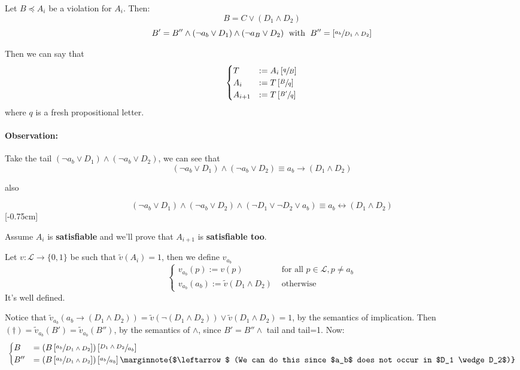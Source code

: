 	\noindent
	Let $B \preceq A_i$ be a violation for $A_i$. Then:
	$$ B = C \vee (D_1 \wedge D_2) $$
	$$ B' = B'' \wedge (\neg a_b \vee D_1) \wedge (\neg a_B \vee D_2) \; \text{ with } \; B'' = \left[\sfrac{a_b}{D_1 \wedge D_2}\right] $$

	\noindent
	Then we can say that
	$$
	\begin{cases}
		T & := A_i \left[\sfrac{q}{B}\right] \\
		A_i & := T \left[\sfrac{B}{q}\right] \\
		A_{i+1} & := T \left[\sfrac{B'}{q}\right]
	\end{cases}
	$$
	where $q$ is a fresh propositional letter.

	\paragraph{Observation:} Take the tail $(\neg a_b \vee D_1) \wedge (\neg a_b \vee D_2)$, we can see that
	$$  (\neg a_b \vee D_1) \wedge (\neg a_b \vee D_2) \equiv a_b \rightarrow (D_1 \wedge D_2) $$

	also

	$$  (\neg a_b \vee D_1) \wedge (\neg a_b \vee D_2) \wedge (\neg D_1 \vee \neg D_2 \vee a_b) \equiv a_b \leftrightarrow (D_1 \wedge D_2) $$ [-0.75cm]

	\noindent
	Assume $A_i$ is \textbf{satisfiable} and we'll prove that $A_{i+1}$ is \textbf{satisfiable too}.

	\begin{definition}Let $v: \mathcal{L} \rightarrow \{0,1\}$ be such that $\tilde v(A_i) = 1$, then we define $v_{a_b}$
	$$
	\begin{cases}
		v_{a_b}(p) := v(p) & \text{ for all } p \in \mathcal{L}, p \neq a_b \\
		v_{a_b}(a_b) := \tilde v (D_1 \wedge D_2) & \text{ otherwise }
	\end{cases}
	$$
	It's well defined.
	\end{definition}

	\noindent
	Notice that $\tilde v_{a_b} (a_b \rightarrow (D_1 \wedge D_2)) = \tilde v(\neg (D_1 \wedge D_2)) \vee \tilde v(D_1 \wedge D_2) = 1$, by the semantics of implication. Then $(\dag) = \tilde v_{a_b} (B') = \tilde v_{a_b} (B'')$, by the semantics of $\wedge$, since $B' = B'' \wedge$ tail and tail=1. Now:
	$$
	\begin{cases}
		B & = \left(B \left[\sfrac{a_b}{D_1 \wedge D_2}\right]\right) \left[\sfrac{D_1 \wedge D_2}{a_b}\right] \\
		B'' & = \left(B\left[\sfrac{a_b}{D_1 \wedge D_2}\right]\right) \left[\sfrac{a_b}{a_b}\right] \marginnote{$\leftarrow$ (We can do this since $a_b$ does not occur in $D_1 \wedge D_2$)}
	\end{cases}
	$$


